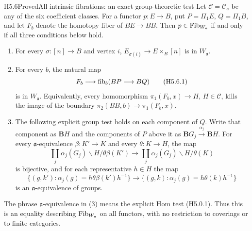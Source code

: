 \begin{claim}{H5.6}{Proved}{All intrinsic fibrations: an exact group-theoretic test}
Let $\mathcal C=\mathcal C_{\mathfrak a}$ be any of the six
coefficient classes. For a functor $p:E\to B$, put
$P=\Pi_1E$, $Q=\Pi_1B$, and let $F_b$ denote the homotopy
fiber of $BE\to BB$. Then $p\in\operatorname{Fib}_{W_{\mathfrak a}}$
if and only if all three conditions below hold.
\begin{enumerate}
\item For every $\sigma:[n]\to B$ and vertex $i$,
$E_{\sigma(i)}\to E\times_B[n]$ is in $W_{\mathfrak a}$.
\item For every $b$, the natural map
\[
 F_b\longrightarrow
       \operatorname{fib}_b(BP\longrightarrow BQ)                     \tag{H5.6.1}
\]
is in $W_{\mathfrak a}$. Equivalently, every homomorphism
$\pi_1(F_b,x)\to H$, $H\in\mathcal C$, kills the image of
the boundary $\pi_2(BB,b)\to\pi_1(F_b,x)$.
\item The following explicit group test holds on each
component of $Q$. Write that component as $\mathbf BH$
and the components of $P$ above it as
$\mathbf BG_j\xrightarrow{\alpha_j}\mathbf BH$.
For every $\mathfrak a$-equivalence $\beta:K'\to K$
and every $\theta:K\to H$, the map
\[
 \coprod_j\alpha_j(G_j)\backslash H/\theta\beta(K')
 \longrightarrow
 \coprod_j\alpha_j(G_j)\backslash H/\theta(K)              \tag{H5.6.2}
\]
is bijective, and for each representative $h\in H$ the map
\[
 \{(g,k'):\alpha_j(g)=h\theta\beta(k')h^{-1}\}
 \longrightarrow
 \{(g,k):\alpha_j(g)=h\theta(k)h^{-1}\}                    \tag{H5.6.3}
\]
is an $\mathfrak a$-equivalence of groups.
\end{enumerate}
The phrase $\mathfrak a$-equivalence in (3) means the explicit
Hom test (H5.0.1). Thus this is an equality describing
$\operatorname{Fib}_{W_{\mathfrak a}}$ on all functors, with no restriction
to coverings or to finite categories.
\end{claim}
